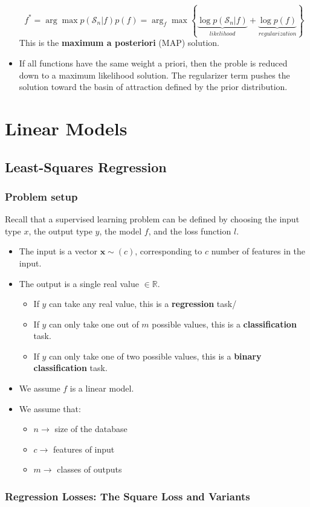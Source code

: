 \documentclass{article}
\newcommand{\tbf}[1]{\textbf{#1}}
\newcommand{\mbf}[1]{\mathbf{#1}}
\begin{document}
\begin{itemize}
        \[f^* = \arg \max p(\mathcal{S}_n | f)p(f) = \arg _f \max \left\{\underbrace{\log p(\mathcal{S}_n|f)}_{likelihood} + \underbrace{\log p(f)}_{regularization} \right\} \]
        This is the \tbf{maximum a posteriori} (MAP) solution. 
        \item If all functions have the same weight a priori, then the proble is reduced down to a maximum likelihood solution. The regularizer term pushes the solution toward the basin of attraction defined by the prior distribution.
    \end{itemize}

    \section{Linear Models}

    \subsection{Least-Squares Regression}

    \subsubsection{Problem setup}
        
    Recall that a supervised learning problem can be defined by choosing the input type $x$, the output type $y$, the model $f$, and the loss function $l$.
    
    \begin{itemize}
        \item The input is a vector $\mbf{x} \sim (c)$, corresponding to $c$ number of features in the input.
        \item The output is a single real value $\in \mathbb{R}$. 
        \begin{itemize}
            \item If $y$ can take any real value, this is a \tbf{regression} task/
            \item If $y$ can only take one out of $m$ possible values, this is a \tbf{classification} task.
            \item If $y$ can only take one of two possible values, this is a \tbf{binary classification} task.
        \end{itemize}
        \item We assume $f$ is a linear model.
        \item We assume that:
        \begin{itemize}
            \item $n \rightarrow$ size of the database
            \item $c \rightarrow$ features of input
            \item $m \rightarrow$ classes of outputs
        \end{itemize}
    \end{itemize}
    \subsubsection{Regression Losses: The Square Loss and Variants}
\end{document}
